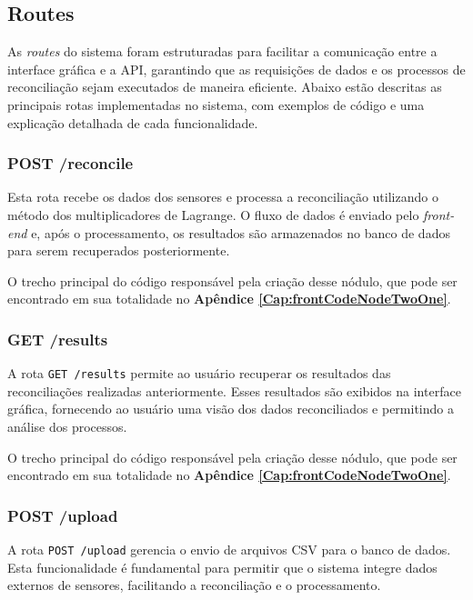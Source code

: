 \subsection{Routes}

As \textit{routes} do sistema foram estruturadas para facilitar a comunicação entre a interface gráfica e a API, garantindo que as requisições de dados e os processos de reconciliação sejam executados de maneira eficiente. Abaixo estão descritas as principais rotas implementadas no sistema, com exemplos de código e uma explicação detalhada de cada funcionalidade.

\subsubsection{POST /reconcile}

Esta rota recebe os dados dos sensores e processa a reconciliação utilizando o método dos multiplicadores de Lagrange. O fluxo de dados é enviado pelo \textit{front-end} e, após o processamento, os resultados são armazenados no banco de dados para serem recuperados posteriormente.

O trecho principal do código responsável pela criação desse nódulo, que pode ser encontrado em sua totalidade no \textbf{Apêndice \ref{Cap:frontCodeNodeTwoOne}}.

\subsubsection{GET /results}

A rota \texttt{GET /results} permite ao usuário recuperar os resultados das reconciliações realizadas anteriormente. Esses resultados são exibidos na interface gráfica, fornecendo ao usuário uma visão dos dados reconciliados e permitindo a análise dos processos.

O trecho principal do código responsável pela criação desse nódulo, que pode ser encontrado em sua totalidade no \textbf{Apêndice \ref{Cap:frontCodeNodeTwoOne}}.

\subsubsection{POST /upload}

A rota \texttt{POST /upload} gerencia o envio de arquivos CSV para o banco de dados. Esta funcionalidade é fundamental para permitir que o sistema integre dados externos de sensores, facilitando a reconciliação e o processamento.

